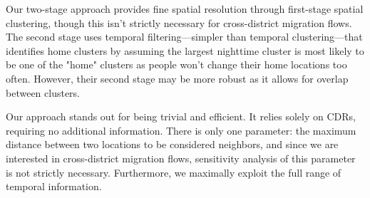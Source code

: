 Our two-stage approach provides fine spatial resolution through first-stage spatial clustering, though this isn't strictly necessary for cross-district migration flows.
The second stage uses temporal filtering---simpler than temporal clustering---that identifies home clusters by assuming the largest nighttime cluster is most likely to be one of the "home" clusters as people won't change their home locations too often.
However, their second stage may be more robust as it allows for overlap between clusters.

Our approach stands out for being trivial and efficient.
It relies solely on CDRs, requiring no additional information.
There is only one parameter: the maximum distance between two locations to be considered neighbors, and since we are interested in cross-district migration flows, sensitivity analysis of this parameter is not strictly necessary.
Furthermore, we maximally exploit the full range of temporal information.
